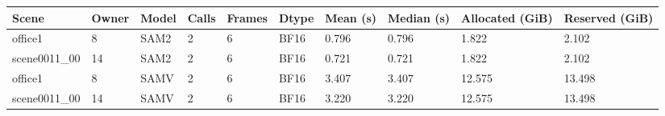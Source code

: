 \begin{tabular}{llllllllll}
\toprule
Scene & Owner & Model & Calls & Frames & Dtype & Mean (s) & Median (s) & Allocated (GiB) & Reserved (GiB) \\
\midrule
office1 & 8 & SAM2 & 2 & 6 & BF16 & 0.796 & 0.796 & 1.822 & 2.102 \\
scene0011\_00 & 14 & SAM2 & 2 & 6 & BF16 & 0.721 & 0.721 & 1.822 & 2.102 \\
office1 & 8 & SAMV & 2 & 6 & BF16 & 3.407 & 3.407 & 12.575 & 13.498 \\
scene0011\_00 & 14 & SAMV & 2 & 6 & BF16 & 3.220 & 3.220 & 12.575 & 13.498 \\
\bottomrule
\end{tabular}
